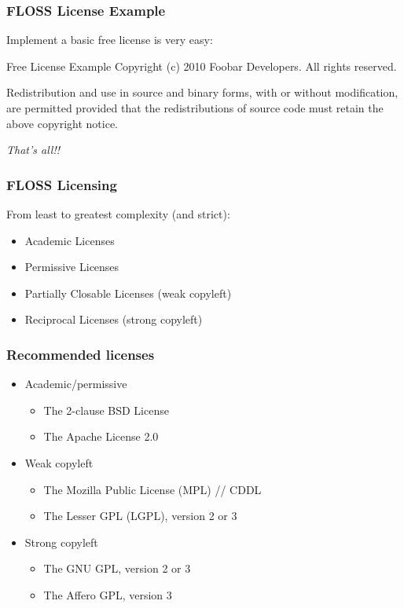 \begin{frame}
\frametitle{FLOSS License Example}

Implement a basic free license is very easy: 

\begin{block}{Free License Example}
Copyright (c) 2010 Foobar Developers. All rights reserved. 

\medskip
Redistribution and use in source and binary forms, with or without modification, are permitted provided that the redistributions of source code must retain the above copyright notice.
\end{block}

\textit{That's all!!}

\end{frame}



\begin{frame}
\frametitle{FLOSS Licensing}

From least to greatest complexity (and strict):
\begin{itemize}
\item \alert{Academic Licenses}
\item \alert{Permissive Licenses}
\item \alert{Partially Closable Licenses} (weak copyleft)
\item \alert{Reciprocal Licenses} (strong copyleft)
\end{itemize}

\end{frame}


\begin{frame}
\frametitle{Recommended licenses}

\begin{itemize}
\item	Academic/permissive
	\begin{itemize}
	\item The 2-clause BSD License 
	\item The Apache License 2.0 
	\end{itemize}
\item Weak copyleft
	\begin{itemize}
	\item The Mozilla Public License (MPL) // CDDL
	\item The Lesser GPL (LGPL), version 2 or 3
	\end{itemize}
\item Strong copyleft
	\begin{itemize}
	\item The GNU GPL, version 2 or 3 
	\item The Affero GPL, version 3
	\end{itemize}
\end{itemize}

\end{frame}


